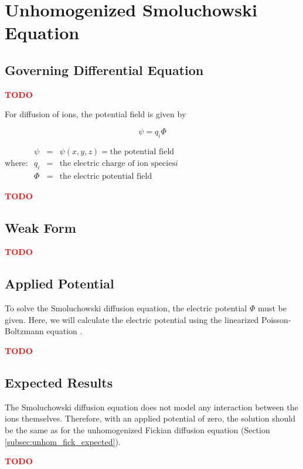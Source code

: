 
\section{Unhomogenized Smoluchowski Equation}\label{sec:unhom_smol}

\subsection{Governing Differential Equation}\label{subsec:unhom_smol_gov}

\textcolor{red}{\textbf{TODO}}

For diffusion of ions, the potential field is given by

\begin{equation}
\psi=q_i \Phi
\end{equation}

where:
$\begin{array}{rcl}
\psi & = & \psi(x,y,z) = \text{the potential field} \\
q_i & = & \text{the electric charge of ion species} i\\
\Phi & = & \text{the electric potential field}
\end{array}$

\textcolor{red}{\textbf{TODO}}

\subsection{Weak Form}\label{subsec:unhom_smol_weak}

\textcolor{red}{\textbf{TODO}}

\subsection{Applied Potential}\label{subsec:unhom_smol_potential}

To solve the Smoluchowski diffusion equation, the electric potential $\Phi$ must be given.
Here, we will calculate the electric potential using the linearized Poisson-Boltzmann equation
\cite{McQuarrie-StatMech}.

\textcolor{red}{\textbf{TODO}}

\subsection{Expected Results}\label{subsec:unhom_smol_expected}

The Smoluchowski diffusion equation does not model any interaction between the ions themselves.
Therefore, with an applied potential of zero,
the solution should be the same as for the
unhomogenized Fickian diffusion equation (Section \ref{subsec:unhom_fick_expected}).

\textcolor{red}{\textbf{TODO}}

